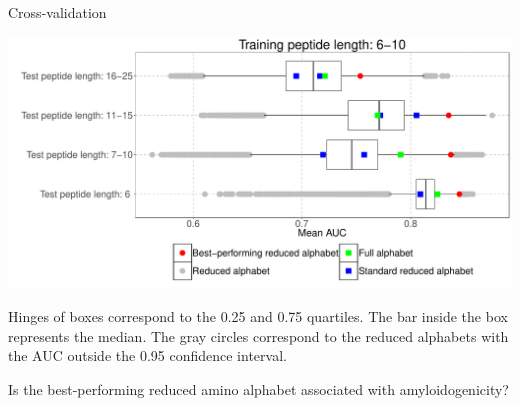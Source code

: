 \documentclass{beamer}\usepackage[]{graphicx}\usepackage[]{color}
\makeatletter
\def\maxwidth{ %
  \ifdim\Gin@nat@width>\linewidth
    \linewidth
  \else
    \Gin@nat@width
  \fi
}
\newenvironment{knitrout}{}{} %
\makeatother
\begin{document}
    \begin{frame}{Cross-validation}
\begin{knitrout}
\color{fgcolor}

{\centering \includegraphics[width=\maxwidth]{figure/unnamed-chunk-2-1} 

}



\end{knitrout}
  \tiny
Hinges of boxes correspond to 
the 0.25 and 0.75 quartiles. The bar inside the box represents the median. The 
gray circles correspond to the reduced alphabets with the AUC outside the 0.95 
confidence interval.

  \end{frame}



\begin{frame}{}
Is the best-performing reduced amino alphabet associated with amyloidogenicity?
\end{frame}
\end{document}
